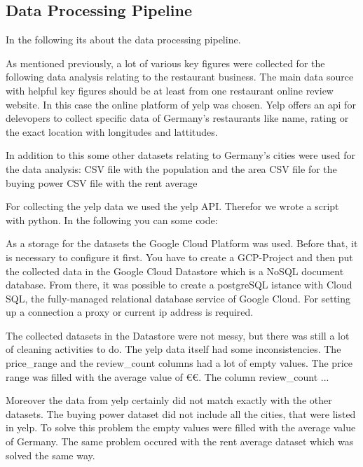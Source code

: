 \subsection{Data Processing Pipeline}
\label{subsec:pipeline}
In the following its about the data processing pipeline.

\label{subsec:Data sources}
As mentioned previously, a lot of various key figures were collected for the following data analysis relating to the restaurant business. The main data source with helpful key figures should be at least from one restaurant online review website. In this case the online platform of yelp was chosen. Yelp offers an api for delevopers to collect specific data of Germany's restaurants like name, rating or the exact location with longitudes and lattitudes.   

In addition to this some other datasets relating to Germany's cities were used for the data analysis:
CSV file with the population and the area
CSV file for the buying power 
CSV file with the rent average

\label{subsec:Data Ingestion}
For collecting the yelp data we used the yelp API. Therefor we wrote a script with python. In the following you can some code:

\label{subsec:Data Storage}
As a storage for the datasets the Google Cloud Platform was used. Before that, it is necessary to configure it first. You have to create a GCP-Project and then put the collected data in the Google Cloud Datastore which is a NoSQL document database. From there, it was possible to create a postgreSQL istance with Cloud SQL, the fully-managed relational database service of Google Cloud. For setting up a connection a proxy or current ip address is required.

\label{subsec:Data cleaning}
The collected datasets in the Datastore were not messy, but there was still a lot of cleaning activities to do. The yelp data itself had some inconsistencies. The price\_range and the review\_count columns had a lot of empty values. The price range was filled with the average value of \euro\euro. 
The column review\_count ...%

Moreover the data from yelp certainly did not match exactly with the other datasets. The buying power dataset did not include all the cities, that were listed in yelp. To solve this problem the empty values were filled with the average value of Germany. The same problem occured with the rent average dataset which was solved the same way.

\label{subsec:Data analysis}
